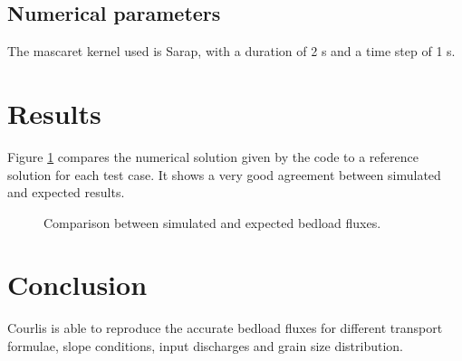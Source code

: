 \subsection{Numerical parameters}

The mascaret kernel used is Sarap, with a duration of 2 s and a time step of 1 s.

\section{Results}

Figure \ref{fig:bedload} compares the numerical solution given by the
code to a reference solution for each test case. It shows a very good
agreement between simulated and expected results.

\begin{figure}[h]
 \centering
 \caption{Comparison between simulated and expected bedload fluxes.}
 \label{fig:bedload}
\end{figure}

\section{Conclusion}

Courlis is able to reproduce the accurate bedload fluxes for different
transport formulae, slope conditions, input discharges and grain size
distribution.


